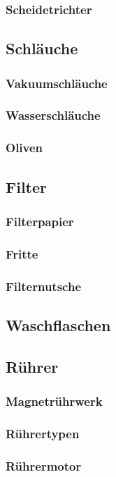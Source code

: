 \subsubsection{Scheidetrichter}

\subsection{Schläuche}
\subsubsection{Vakuumschläuche}
\subsubsection{Wasserschläuche}
\subsubsection{Oliven}

\subsection{Filter}
\subsubsection{Filterpapier}
\subsubsection{Fritte}
\subsubsection{Filternutsche}

\subsection{Waschflaschen}

\subsection{Rührer}
\subsubsection{Magnetrührwerk}
\subsubsection{Rührertypen}
\subsubsection{Rührermotor}

